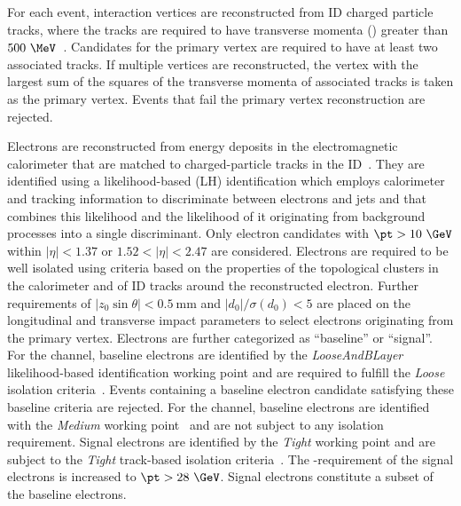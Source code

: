 
\label{sec:reco}


For each event, interaction vertices are reconstructed from ID charged particle tracks, where the tracks are required to have transverse momenta (\pt) greater than $500~\MeV$~\cite{ATL-PHYS-PUB-2015-026}. Candidates for the primary vertex are required to have at least two associated tracks. If multiple vertices are reconstructed, the vertex with the largest sum of the squares of the transverse momenta of associated tracks is taken as the primary vertex. Events that fail the primary vertex reconstruction are rejected. 

Electrons are reconstructed from energy deposits in the electromagnetic calorimeter that are matched to charged-particle tracks in the ID~\cite{EGAM-2018-01}. They are identified using a likelihood-based (LH) identification which employs calorimeter and tracking information to discriminate between electrons and jets and that combines this likelihood and the likelihood of it originating from background processes into a single discriminant. Only electron candidates with $\pt>10~\GeV$ within $|\eta|< 1.37$ or $1.52 < |\eta| < 2.47$ are considered. %
Electrons are required to be well isolated using criteria based on the properties of the topological clusters in the calorimeter and of ID tracks around the reconstructed electron. Further requirements of $|z_0\sin\theta|<0.5~$mm and $|d_0|/\sigma(d_0)<5$ are placed on the longitudinal and transverse impact parameters to select electrons originating from the primary vertex. 
Electrons are further categorized as “baseline” or “signal”. For the \allhad channel, baseline electrons are identified by the \emph{LooseAndBLayer} likelihood-based identification working point and are required to fulfill the \emph{Loose} isolation criteria~\cite{PERF-2017-01,EGAM-2018-01}. Events containing a baseline electron candidate satisfying these baseline criteria are rejected. 
For the \onelep channel, baseline electrons are identified with the \emph{Medium} working point~\cite{EGAM-2018-01} and are not subject to any isolation requirement. Signal electrons are identified by the \emph{Tight} working point and are subject to the \emph{Tight} track-based isolation criteria~\cite{EGAM-2018-01}. The \pt-requirement of the signal electrons is increased to $\pt>28~\GeV$. Signal electrons constitute a subset of the baseline electrons.


